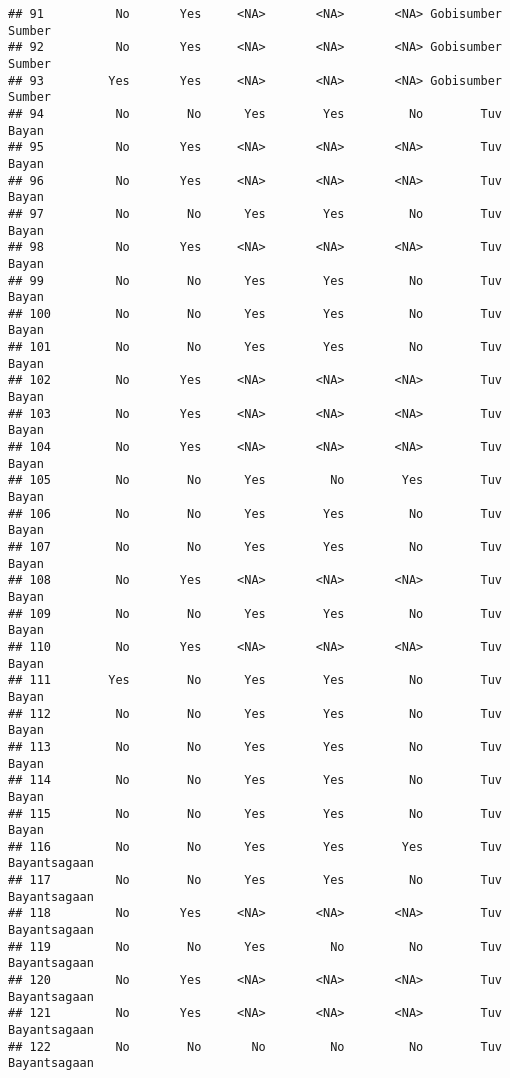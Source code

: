\documentclass[
]{article}
\begin{document}
\begin{verbatim}
## 91          No       Yes     <NA>       <NA>       <NA> Gobisumber       Sumber
## 92          No       Yes     <NA>       <NA>       <NA> Gobisumber       Sumber
## 93         Yes       Yes     <NA>       <NA>       <NA> Gobisumber       Sumber
## 94          No        No      Yes        Yes         No        Tuv        Bayan
## 95          No       Yes     <NA>       <NA>       <NA>        Tuv        Bayan
## 96          No       Yes     <NA>       <NA>       <NA>        Tuv        Bayan
## 97          No        No      Yes        Yes         No        Tuv        Bayan
## 98          No       Yes     <NA>       <NA>       <NA>        Tuv        Bayan
## 99          No        No      Yes        Yes         No        Tuv        Bayan
## 100         No        No      Yes        Yes         No        Tuv        Bayan
## 101         No        No      Yes        Yes         No        Tuv        Bayan
## 102         No       Yes     <NA>       <NA>       <NA>        Tuv        Bayan
## 103         No       Yes     <NA>       <NA>       <NA>        Tuv        Bayan
## 104         No       Yes     <NA>       <NA>       <NA>        Tuv        Bayan
## 105         No        No      Yes         No        Yes        Tuv        Bayan
## 106         No        No      Yes        Yes         No        Tuv        Bayan
## 107         No        No      Yes        Yes         No        Tuv        Bayan
## 108         No       Yes     <NA>       <NA>       <NA>        Tuv        Bayan
## 109         No        No      Yes        Yes         No        Tuv        Bayan
## 110         No       Yes     <NA>       <NA>       <NA>        Tuv        Bayan
## 111        Yes        No      Yes        Yes         No        Tuv        Bayan
## 112         No        No      Yes        Yes         No        Tuv        Bayan
## 113         No        No      Yes        Yes         No        Tuv        Bayan
## 114         No        No      Yes        Yes         No        Tuv        Bayan
## 115         No        No      Yes        Yes         No        Tuv        Bayan
## 116         No        No      Yes        Yes        Yes        Tuv Bayantsagaan
## 117         No        No      Yes        Yes         No        Tuv Bayantsagaan
## 118         No       Yes     <NA>       <NA>       <NA>        Tuv Bayantsagaan
## 119         No        No      Yes         No         No        Tuv Bayantsagaan
## 120         No       Yes     <NA>       <NA>       <NA>        Tuv Bayantsagaan
## 121         No       Yes     <NA>       <NA>       <NA>        Tuv Bayantsagaan
## 122         No        No       No         No         No        Tuv Bayantsagaan

\end{verbatim}
\end{document}
